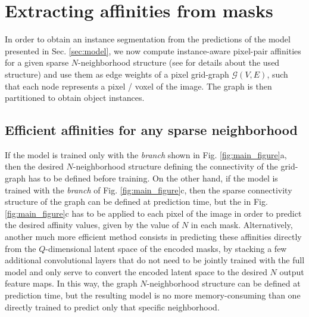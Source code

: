 \section{Extracting affinities from \maskname masks}
In order to obtain an instance segmentation from the predictions of the model presented in Sec. \ref{sec:model}, we now compute instance-aware pixel-pair affinities for a given sparse $N$-neighborhood structure (see  for details about the used structure) and use them as edge weights of a pixel grid-graph $\mathcal{G}(V,E)$, such that each node represents a pixel / voxel of the image. The graph is then partitioned to obtain object instances.



\subsection{Efficient affinities for any sparse neighborhood}\label{sec:efficient_affs}
If the model is trained only with the \emph{\sparseBr branch} shown in Fig. \ref{fig:main_figure}a, then the desired $N$-neighborhood structure defining the connectivity of the grid-graph has to be defined before training. 
On the other hand, if the model is trained with the \emph{\encBr branch} of Fig. \ref{fig:main_figure}c, then the sparse connectivity structure of the graph can be defined at prediction time, but the \maskDec in Fig. \ref{fig:main_figure}c has to be applied to each pixel of the image in order to predict the desired affinity values, given by the value of $N$ in each mask. 
Alternatively, another much more efficient method consists in predicting these affinities directly from the $Q$-dimensional latent space of the encoded masks, by stacking a few additional convolutional layers that do not need to be jointly trained with the full model and only serve to convert the encoded latent space to the desired $N$ output feature maps.
In this way, the graph $N$-neighborhood structure can be defined at prediction time, but the resulting model is no more memory-consuming than one directly trained to predict only that specific neighborhood. 



